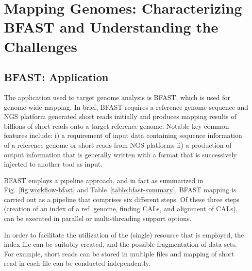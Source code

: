 \documentclass{acm_proc_article-sp}
\begin{document}
\section{Mapping Genomes: Characterizing BFAST and Understanding
  the Challenges}

\subsection{BFAST: Application}


The application used to target genome analysis is
BFAST\cite{bfast2009,bfast2009b}, which is used for genome-wide
mapping.  In brief, BFAST requires a reference genome sequence and NGS
platform generated short reads initially and produces mapping results
of billions of short reads onto a target reference genome.  Notable
key common features include: i) a requirement of input data containing
sequence information of a reference genome or short reads from NGS
platforms ii) a production of output information that is generally
written with a format that is successively injected to another tool as
input.




BFAST employs a pipeline approach, and in fact as summarized in
Fig.~\ref{fig:workflow-bfast} and Table~\ref{table:bfast-summary},
BFAST mapping is carried out as a pipeline that comprises six
different steps. Of these three steps (creation of an index of a
ref. genome, finding CALs, and alignment of CALs), can be executed in
parallel or multi-threading support options.
 
In order to facilitate the utilization of the (single) resource that
is employed, the index file can be suitably created, and the possible
fragmentation of data sets. For example, short reads can be stored in
multiple files and mapping of short read in each file can be conducted
independently.
 
\end{document}
